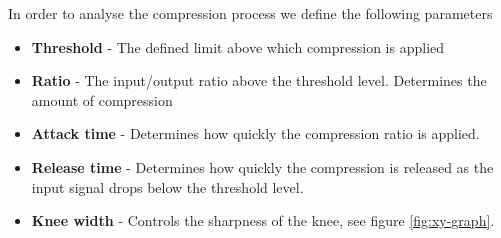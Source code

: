 \documentclass[]{article}
\begin{document}
In order to analyse the compression process we define the following parameters
\begin{itemize}
\item{\textbf{Threshold} - The defined limit above which compression is applied }
\item{\textbf{Ratio} - The input/output ratio above the threshold level. Determines the amount of compression}
\item{\textbf{Attack time} - Determines how quickly the compression ratio is applied.}
\item{\textbf{Release time} - Determines how quickly the compression is released as the input signal drops below the threshold level.}
\item{\textbf{Knee width} - Controls the sharpness of the knee, see figure \ref{fig:xy-graph}.}
\end{itemize}
\end{document}
